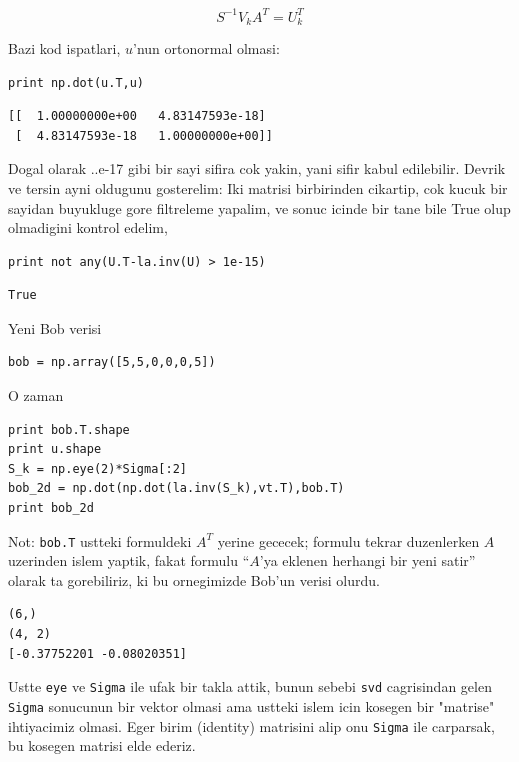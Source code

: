 \documentclass[12pt,fleqn]{article}\usepackage{../common}
\begin{document}
$$ S^{-1} V_k A^T = U_k^T $$

Bazi kod ispatlari, $u$'nun ortonormal olmasi:

\begin{verbatim}
print np.dot(u.T,u)
\end{verbatim}

\begin{verbatim}
[[  1.00000000e+00   4.83147593e-18]
 [  4.83147593e-18   1.00000000e+00]]
\end{verbatim}

Dogal olarak ..e-17 gibi bir sayi sifira cok yakin, yani sifir kabul
edilebilir. Devrik ve tersin ayni oldugunu gosterelim: Iki matrisi
birbirinden cikartip, cok kucuk bir sayidan buyukluge gore filtreleme
yapalim, ve sonuc icinde bir tane bile True olup olmadigini kontrol
edelim,

\begin{verbatim}
print not any(U.T-la.inv(U) > 1e-15)
\end{verbatim}

\begin{verbatim}
True
\end{verbatim}

Yeni Bob verisi 

\begin{verbatim}
bob = np.array([5,5,0,0,0,5]) 
\end{verbatim}

O zaman 

\begin{verbatim}
print bob.T.shape
print u.shape
S_k = np.eye(2)*Sigma[:2]
bob_2d = np.dot(np.dot(la.inv(S_k),vt.T),bob.T)
print bob_2d
\end{verbatim}

Not: \verb!bob.T! ustteki formuldeki $A^T$ yerine gececek; formulu tekrar
duzenlerken $A$ uzerinden islem yaptik, fakat formulu ``$A$'ya eklenen
herhangi bir yeni satir'' olarak ta gorebiliriz, ki bu ornegimizde Bob'un
verisi olurdu. 

\begin{verbatim}
(6,)
(4, 2)
[-0.37752201 -0.08020351]
\end{verbatim}

Ustte \verb!eye! ve \verb!Sigma! ile ufak bir takla attik, bunun sebebi
\verb!svd! cagrisindan gelen \verb!Sigma!  sonucunun bir vektor olmasi ama
ustteki islem icin kosegen bir "matrise" ihtiyacimiz olmasi. Eger birim
(identity) matrisini alip onu \verb!Sigma! ile carparsak, bu kosegen
matrisi elde ederiz.
\end{document}
